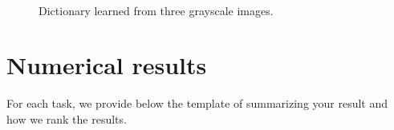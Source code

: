 \documentclass[a4paper,11pt]{article}
\begin{document}
\begin{figure}[!ht]
\centering
{}  
  \\ 
\caption{Dictionary learned from three grayscale images.}
\label{fig:dl_gray}
\end{figure}



\section{Numerical results}

For each task, we provide below the template of summarizing your result and how we rank the results. 

\end{document}
